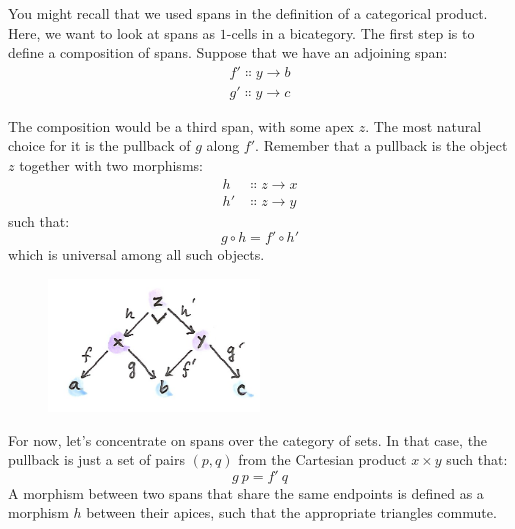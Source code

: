 \noindent
You might recall that we used spans in the definition of a categorical
product. Here, we want to look at spans as $1$-cells in a bicategory. The
first step is to define a composition of spans. Suppose that we have an
adjoining span:
\begin{gather*}
f' \Colon y \to b \\
g' \Colon y \to c
\end{gather*}

\begin{figure}[H]
\centering
{}
\end{figure}

\noindent
The composition would be a third span, with some apex $z$. The
most natural choice for it is the pullback of $g$ along
$f'$. Remember that a pullback is the object $z$
together with two morphisms:
\begin{align*}
h &\Colon z \to x \\
h' &\Colon z \to y
\end{align*}
such that:
\[g \circ h = f' \circ h'\]
which is universal among all such objects.

\begin{figure}[H]
\centering
\includegraphics[width=0.5\textwidth]{images/pullspan.png}
\end{figure}

\noindent
For now, let's concentrate on spans over the category of sets. In that
case, the pullback is just a set of pairs $(p, q)$ from the
Cartesian product $x \times y$ such that:
\[g\ p = f'\ q\]
A morphism between two spans that share the same endpoints is defined as
a morphism $h$ between their apices, such that the appropriate
triangles commute.

